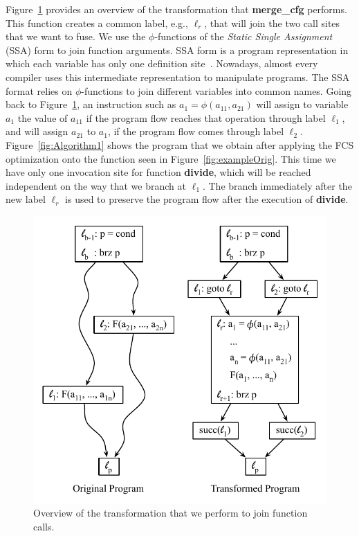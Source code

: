 \documentclass[times,10pt,twocolumn]{article}
\begin{document}
Figure~\ref{fig:OverviewTransform} provides an overview of the
transformation that \textbf{merge\_cfg} performs.
This function creates a common label, e.g., $\ell_r$, that will join the
two call sites that we want to fuse.
We use the $\phi$-functions of the {\em Static Single
Assignment}~\cite{Cytron91} (SSA) form to join function arguments.
SSA form is a program representation in which each variable has only one
definition site~\cite{Cytron91}.
Nowadays, almost every compiler uses this intermediate representation to
manipulate programs.
The SSA format relies on $\phi$-functions to join different variables into
common names.
Going back to Figure~\ref{fig:OverviewTransform}, an instruction such as
$a_1 =\phi(a_{11}, a_{21})$ will assign to variable $a_1$
the value of $a_{11}$ if the program flow reaches that operation through label
$\ell_1$, and will assign $a_{21}$ to $a_1$, if the program flow comes through
label $\ell_2$.
Figure~\ref{fig:Algorithm1} shows the program that we obtain after applying
the FCS optimization onto the function seen in Figure~\ref{fig:exampleOrig}.
This time we have only one invocation site for function \textbf{divide}, which
will be reached independent on the way that we branch at $\ell_1$.
The branch immediately after the new label $\ell_r$ is used to preserve the
program flow after the execution of \textbf{divide}.

\begin{figure}[t!]
\begin{center}
\includegraphics[width=1\columnwidth]{images/OverviewTransform}
\end{center}
\caption{\label{fig:OverviewTransform}
Overview of the transformation that we perform to join function calls.}
\end{figure}
\end{document}
